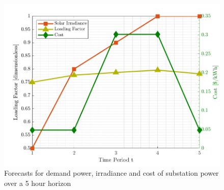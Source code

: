 \documentclass[../../outputs/main.tex]{subfiles}
\begin{document}


\begin{figure}[t]
    \centering
    \includegraphics[height=0.25\textheight]{../figures/T5-inputCurves/InputCurves_Horizon_5.png}
    \caption{Forecasts for demand power, irradiance and cost of substation power over a 5 hour horizon}
    \label{fig:inputCurve-5}
    \vspace{-4mm}
\end{figure}

\def\ds{\rule{0pt}{1.5ex}} %



\end{document}
